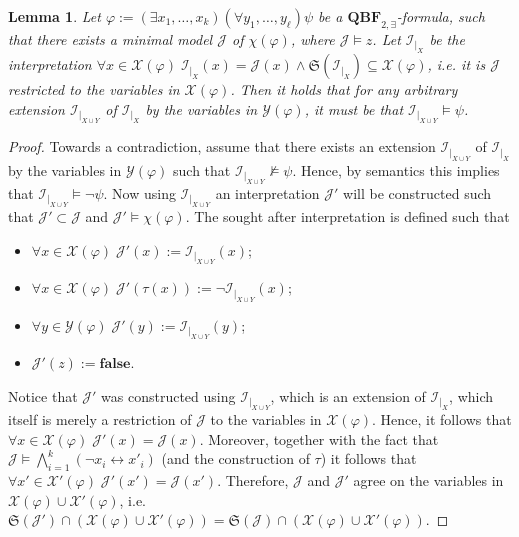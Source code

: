\documentclass [11pt]{article}
\newcommand{\False}{\mathbf{false}}
\newcommand{\nmodels}{\not\models}
\newtheorem{lemma}[theorem]{Lemma}
\begin{document}
\begin{lemma}
\label{lem:sat-phi}
Let $\varphi:=(\exists x_1, \dots, x_k) (\forall y_1, \dots, y_\ell) \psi$ be a $\mathbf{QBF}_{2,\exists}$-formula, such that there exists a minimal model $\mathcal{J}$ of $\chi(\varphi)$, where $\mathcal{J} \models z$. Let $\mathcal{I}_{|_X}$ be the interpretation $\forall x \in \mathcal{X}(\varphi)\; \mathcal{I}_{|_X}(x)=\mathcal{J}(x) \land \mathfrak{S}(\mathcal{I}_{|_X}) \subseteq \mathcal{X}(\varphi)$, i.e. it is $\mathcal{J}$ restricted to the variables in $\mathcal{X}(\varphi)$. Then it holds that for any arbitrary extension $\mathcal{I}_{|_{X\cup Y}}$ of $\mathcal{I}_{|_X}$ by the variables in $\mathcal{Y}(\varphi)$, it must be that $\mathcal{I}_{|_{X\cup Y}}\models \psi$. 
\end{lemma}
\begin{proof}
Towards a contradiction, assume that there exists an extension $\mathcal{I}_{|_{X\cup Y}}$ of $\mathcal{I}_{|_{X}}$ by the variables in $\mathcal{Y}(\varphi)$ such that $\mathcal{I}_{|_{X\cup Y}} \nmodels \psi$. Hence, by semantics this implies that $\mathcal{I}_{|_{X\cup Y}} \models  \neg\psi$. Now using $\mathcal{I}_{|_{X\cup Y}}$ an interpretation $\mathcal{J}'$ will be constructed such that $\mathcal{J}' \subset \mathcal{J}$ and $\mathcal{J}' \models \chi(\varphi)$. The sought after interpretation is defined such that
\begin{itemize}
\item $\forall x \in \mathcal{X}(\varphi) \; \mathcal{J}'(x):=\mathcal{I}_{|_{X\cup Y}}(x)$;
\item $\forall x \in \mathcal{X}(\varphi) \; \mathcal{J}'(\tau(x)):=\neg \mathcal{I}_{|_{X\cup Y}}(x)$;
\item $\forall y \in \mathcal{Y}(\varphi) \; \mathcal{J}'(y):=\mathcal{I}_{|_{X\cup Y}}(y)$;
\item $ \mathcal{J}'(z):=\False$.
\end{itemize}
Notice that $\mathcal{J}'$ was constructed using $\mathcal{I}_{|_{X\cup Y}}$, which is an extension of $\mathcal{I}_{|_{X}}$, which itself is merely a restriction of $\mathcal{J}$ to the variables in $\mathcal{X}(\varphi)$. Hence,
it follows that $\forall x \in \mathcal{X}(\varphi) \; \mathcal{J}'(x)=\mathcal{J}(x)$. 
Moreover, together with the fact that $\mathcal{J} \models \bigwedge_{i=1}^k (\neg x_i \leftrightarrow x'_i)$ (and the construction of $\tau$) it follows that $\forall x' \in \mathcal{X}'(\varphi) \; \mathcal{J}'(x')=\mathcal{J}(x')$. Therefore, $\mathcal{J}$ and $\mathcal{J}'$ agree on the variables in $\mathcal{X}(\varphi)\cup \mathcal{X}'(\varphi)$, i.e. $\mathfrak{S}(\mathcal{J}') \cap (\mathcal{X}(\varphi)\cup \mathcal{X}'(\varphi))=\mathfrak{S}(\mathcal{J}) \cap (\mathcal{X}(\varphi)\cup \mathcal{X}'(\varphi))$. 

\end{proof}
\end{document}
